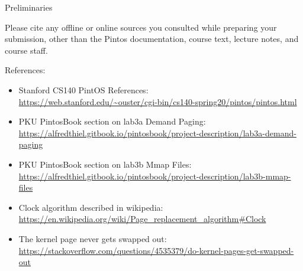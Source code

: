 \begin{titlepage}
\begin{aspect}{Preliminaries}
\begin{tcolorbox}
			Please cite any offline or online sources you consulted while
			preparing your submission, other than the Pintos documentation, course
			text, lecture notes, and course staff.
		\end{tcolorbox}
		References:
		\begin{itemize}
			\item Stanford CS140 PintOS References: \\
			      \url{https://web.stanford.edu/~ouster/cgi-bin/cs140-spring20/pintos/pintos.html}
			\item PKU PintosBook section on lab3a Demand Paging: \\
			      \url{https://alfredthiel.gitbook.io/pintosbook/project-description/lab3a-demand-paging}
			\item PKU PintosBook section on lab3b Mmap Files: \\
			      \url{https://alfredthiel.gitbook.io/pintosbook/project-description/lab3b-mmap-files}
			\item Clock algorithm described in wikipedia: \\
			      \url{https://en.wikipedia.org/wiki/Page_replacement_algorithm#Clock}
			\item The kernel page never gets swapped out: \\
			      \url{https://stackoverflow.com/questions/4535379/do-kernel-pages-get-swapped-out}
		\end{itemize}
	\end{aspect}

\end{titlepage}
